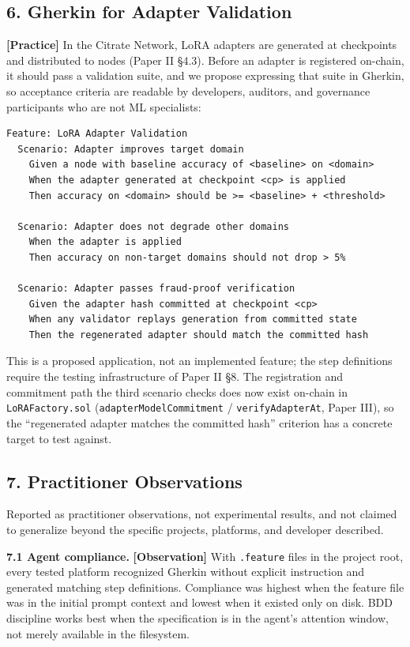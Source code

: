 \subsection{6. Gherkin for Adapter
Validation}\label{gherkin-for-adapter-validation}

\textbf{{[}Practice{]}} In the Citrate Network, LoRA adapters are
generated at checkpoints and distributed to nodes (Paper II §4.3).
Before an adapter is registered on-chain, it should pass a validation
suite, and we propose expressing that suite in Gherkin, so acceptance
criteria are readable by developers, auditors, and governance
participants who are not ML specialists:

\begin{verbatim}
Feature: LoRA Adapter Validation
  Scenario: Adapter improves target domain
    Given a node with baseline accuracy of <baseline> on <domain>
    When the adapter generated at checkpoint <cp> is applied
    Then accuracy on <domain> should be >= <baseline> + <threshold>

  Scenario: Adapter does not degrade other domains
    When the adapter is applied
    Then accuracy on non-target domains should not drop > 5%

  Scenario: Adapter passes fraud-proof verification
    Given the adapter hash committed at checkpoint <cp>
    When any validator replays generation from committed state
    Then the regenerated adapter should match the committed hash
\end{verbatim}

This is a proposed application, not an implemented feature; the step
definitions require the testing infrastructure of Paper II §8. The
registration and commitment path the third scenario checks does now
exist on-chain in \texttt{LoRAFactory.sol}
(\texttt{adapterModelCommitment} / \texttt{verifyAdapterAt}, Paper III),
so the ``regenerated adapter matches the committed hash'' criterion has
a concrete target to test against.

\subsection{7. Practitioner
Observations}\label{practitioner-observations}

Reported as practitioner observations, not experimental results, and not
claimed to generalize beyond the specific projects, platforms, and
developer described.

\textbf{7.1 Agent compliance.} \textbf{{[}Observation{]}} With
\texttt{.feature} files in the project root, every tested platform
recognized Gherkin without explicit instruction and generated matching
step definitions. Compliance was highest when the feature file was in
the initial prompt context and lowest when it existed only on disk. BDD
discipline works best when the specification is in the agent's attention
window, not merely available in the filesystem.

